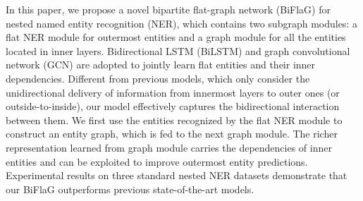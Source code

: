In this paper, we propose a novel bipartite flat-graph network (BiFlaG) for nested named entity recognition (NER), which contains two subgraph modules: a flat NER module for outermost entities and a graph module for all the entities located in inner layers. Bidirectional LSTM (BiLSTM) and graph convolutional network (GCN) are adopted to jointly learn flat entities and their inner dependencies. Different from previous models, which only consider the unidirectional delivery of information from innermost layers to outer ones (or outside-to-inside), our model effectively captures the bidirectional interaction between them.  We first use the entities recognized by the flat NER module to construct an entity graph, which is fed to the next graph module. The richer representation learned from graph module carries the dependencies of inner entities and can be exploited to improve outermost entity predictions. Experimental results on three standard nested NER datasets demonstrate that our BiFlaG outperforms previous state-of-the-art models.
